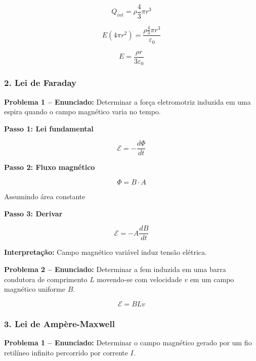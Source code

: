 \documentclass[12pt,a4paper]{article}
\begin{document}
\begin{equation}
    Q_{int} = \rho \frac{4}{3}\pi r^3
\end{equation}

\begin{equation}
    E(4\pi r^2) = \frac{\rho \frac{4}{3}\pi r^3}{\varepsilon_0}
\end{equation}

\begin{equation}
    \boxed{E = \frac{\rho r}{3\varepsilon_0}}
\end{equation}

\subsubsection*{2. Lei de Faraday}

\textbf{Problema 1 -- Enunciado:} Determinar a força eletromotriz induzida em uma espira quando o campo magnético varia no tempo.

\textbf{Passo 1: Lei fundamental}

\begin{equation}
\mathcal{E} = -\frac{d\Phi}{dt}
\end{equation}

\textbf{Passo 2: Fluxo magnético}

\begin{equation}
\Phi = B \cdot A
\end{equation}

Assumindo área constante 

\textbf{Passo 3: Derivar}

\begin{equation}
\mathcal{E} = -A \frac{dB}{dt}
\end{equation}

\textbf{Interpretação:} Campo magnético variável induz tensão elétrica.

\textbf{Problema 2 -- Enunciado:} Determinar a fem induzida em uma barra condutora de comprimento $L$ movendo-se com velocidade $v$ em um campo magnético uniforme $B$.

\begin{equation}
    \boxed{\mathcal{E} = B L v}
\end{equation}

\subsubsection*{3. Lei de Ampère-Maxwell}

\textbf{Problema 1 -- Enunciado:} Determinar o campo magnético gerado por um fio retilíneo infinito percorrido por corrente $I$.
\end{document}
